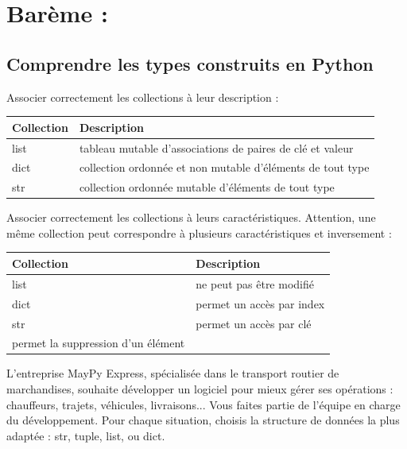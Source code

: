 \documentclass[a4paper, noanswers, addpoints, 12pt]{exam}
\begin{document}
\section*{Barème :}
\begin{center}
  \par\bigskip
  \gradetable[h]
\end{center}
\begin{questions}

\section{Comprendre les types construits en Python}

\question[1] Associer correctement les collections à leur description :
\begin{table}[h]
    \centering
    \begin{tabular}{p{3cm} p{8cm}}
        \textbf{Collection} & \textbf{Description} \\ \hline
        list & tableau mutable d’associations de paires de clé et valeur \\
        dict & collection ordonnée et non mutable d’éléments de tout type \\
        str & collection ordonnée mutable d’éléments de tout type \\
    \end{tabular}
    \label{tab:collections_descriptions}
\end{table}

\question[1] Associer correctement les collections à leurs caractéristiques. Attention, une même collection peut correspondre à plusieurs caractéristiques et inversement :
\begin{table}[h]
    \centering
    \begin{tabular}{p{3cm} p{8cm}}
        \textbf{Collection} & \textbf{Description} \\ \hline
        list & ne peut pas être modifié \\
        dict & permet un accès par index \\
        str & permet un accès par clé \\
        permet la suppression d'un élément \\
    \end{tabular}
    \label{tab:collections_caracteristiques}
\end{table}

\question[1] L’entreprise MayPy Express, spécialisée dans le transport routier de marchandises, souhaite développer un logiciel pour mieux gérer ses opérations : chauffeurs, trajets, véhicules, livraisons...
Vous faites partie de l’équipe en charge du développement.
Pour chaque situation, choisis la structure de données la plus adaptée : str, tuple, list, ou dict.
\begin{parts}

\end{parts}
\end{questions}
\end{document}
